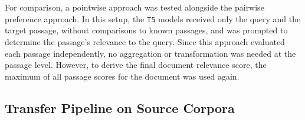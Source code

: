 \\\\
For comparison, a pointwise approach was tested alongside the pairwise preference approach. In this setup, the \texttt{T5} models received only the query and the target passage, without comparisons to known passages, and was prompted to determine the passage's relevance to the query. Since this approach evaluated each passage independently, no aggregation or transformation was needed at the passage level. However, to derive the final document relevance score, the maximum of all passage scores for the document was used again.

\subsection{Transfer Pipeline on Source Corpora}\label{eval-pairwise-preferences-source}

